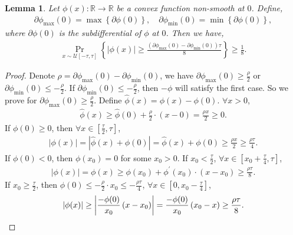 \documentclass[10pt]{article}
\newtheorem{lem}{Lemma}
\def\sR{{\mathbb{R}}}
\def\gU{{\mathcal{U}}}
\DeclareMathOperator*{\probability}{Pr}
\begin{document}
\begin{lem}
\label{lem:non_smooth_convex}
	Let $\phi(x) : \sR \to \sR$ be a convex function non-smooth at $0$. Define,
\begin{equation*}
\begin{split}
	\partial\phi_{\max}{(0)} = \max\left\{ \partial\phi(0) \right\}, \quad \partial\phi_{\min}{(0)} = \min\left\{ \partial\phi(0) \right\},
\end{split}
\end{equation*}	
where $\partial\phi(0)$ is the subdifferential of $\phi$ at $0$. Then we have,
\begin{equation*}
\begin{split}
	\probability\limits_{x \sim \gU[-\tau, \tau]}\left\{ \left| \phi(x) \right| \ge \frac{ \left( \partial\phi_{\max}{(0)} - \partial\phi_{\min}{(0)} \right) \tau}{8} \right\} \ge \frac{1}{8}.
\end{split}
\end{equation*}	
\end{lem}
\begin{proof}
	Denote $\rho = \partial\phi_{\max}{(0)} - \partial\phi_{\min}{(0)}$, we have $\partial\phi_{\max}{(0)} \ge \frac{\rho}{2}$ or $\partial\phi_{\min}{(0)} \le - \frac{\rho}{2}$. If $\partial\phi_{\min}{(0)} \le - \frac{\rho}{2}$, then $-\phi$ will satisfy the first case. So we prove for $\partial\phi_{\max}{(0)} \ge \frac{\rho}{2}$. Define $\hat{\phi}(x) = \phi(x) - \phi(0)$. $\forall x > 0$,
\begin{equation*}
\begin{split}
	\hat{\phi}(x) \ge \hat{\phi}(0) + \frac{\rho}{2} \cdot \left( x - 0\right) = \frac{\rho x}{2} \ge 0.
\end{split}
\end{equation*}
If $\phi(0) \ge 0$, then $\forall x \in \left[\frac{\tau}{2}, \tau \right]$,
\begin{equation*}
\begin{split}
	\left| \phi(x) \right| = \left| \hat{\phi}(x) + \phi(0) \right| = \hat{\phi}(x) + \phi(0) \ge \frac{\rho x}{2} \ge \frac{\rho \tau}{4}.
\end{split}
\end{equation*}
If $\phi(0) < 0$, then $\phi(x_0) = 0$ for some $x_0 > 0$. If $x_0 < \frac{\tau}{2}$, $\forall x \in \left[x_0 + \frac{\tau}{4}, \tau \right]$,
\begin{equation*}
\begin{split}
	\left| \phi(x) \right| =  \phi(x) \ge \phi(x_0) + \phi^\prime(x_0) \cdot \left( x - x_0 \right) \ge \frac{\rho \tau}{8}.
\end{split}
\end{equation*}
If $x_0 \ge \frac{\tau}{2}$, then $\phi(0) \le - \frac{\rho}{2} \cdot x_0 \le - \frac{\rho\tau}{4}$, $\forall x \in \left[0, x_0 - \frac{\tau}{4} \right]$,
\begin{equation*}
	\left| \phi(x) \right| \ge \left| \frac{-\phi(0)}{x_0} \left( x - x_0 \right) \right| = \frac{-\phi(0)}{x_0} \left( x_0 - x \right) \ge \frac{\rho\tau}{8}. \qedhere
\end{equation*}
\end{proof}
\end{document}
